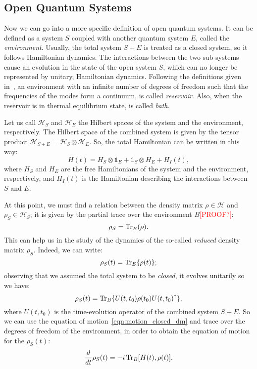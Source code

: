 \subsection{Open Quantum Systems}
Now we can go into a more specific definition of open quantum systems. It can be defined as a system $S$ coupled with another quantum system $E$, called the \emph{environment}. Usually, the total system $S+E$ is treated as a closed system, so it follows Hamiltonian dynamics. The interactions between the two sub-systems cause an evolution in the state of the open system $S$, which can no longer be represented by unitary, Hamiltonian dynamics. Following the definitions given in~\cite{pet_breuer:open_quantum}, an environment with an infinite number of degrees of freedom such that the frequencies of the modes form a continuum, is called \emph{reservoir}. Also, when the reservoir is in thermal equilibrium state, is called \emph{bath}.

Let us call $\mathcal{H}_S$ and $\mathcal{H}_E$ the Hilbert spaces of the system and the environment, respectively. The Hilbert space of the combined system is given by the tensor product $\mathcal{H}_{S+E} = \mathcal{H}_S \otimes \mathcal{H}_E$. So, the total Hamiltonian can be written in this way:
\begin{equation}
    H(t) = H_S \otimes \mathds{1}_E + \mathds{1}_S \otimes H_E + H_I(t),
\end{equation}
where $H_S$ and $H_E$ are the free Hamiltonians of the system and the environment, respectively, and $H_I(t)$ is the Hamiltonian describing the interactions between $S$ and $E$.

At this point, we must find a relation between the density matrix $\rho \in \mathcal{H}$ and $\rho_S \in \mathcal{H}_S$; it is given by the partial trace over the environment $B$\textcolor{red}{[PROOF?]}:
\begin{equation}
    \rho_S = \operatorname{Tr}_E(\rho).
\end{equation}
This can help us in the study of the dynamics of the so-called \emph{reduced} density matrix $\rho_S$. Indeed, we can write:
\begin{equation}
    \rho_S(t) = \operatorname{Tr}_E\{\rho(t)\};
\end{equation}
observing that we assumed the total system to be \emph{closed}, it evolves unitarily so we have:
\begin{equation}
    \rho_S(t) = \operatorname{Tr}_B\{U(t, t_0)\rho(t_0)U(t, t_0)^\dagger\},
\end{equation}
where $U(t, t_0)$ is the time-evolution operator of the combined system $S+E$. So we can use the equation of motion~\ref{eqn:motion_closed_dm} and trace over the degrees of freedom of the environment, in order to obtain the equation of motion for the $\rho_S(t)$:
\begin{equation}
\label{eqn:motion_open}
    \frac{d}{dt}\rho_S(t) = -i \operatorname{Tr}_B[H(t), \rho(t)].
\end{equation}

